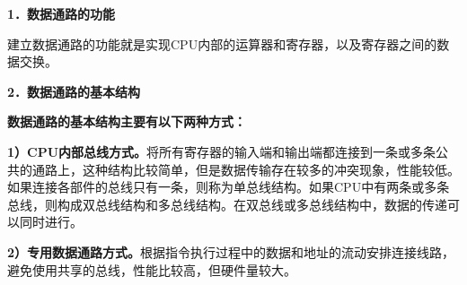 {\textbf{1．数据通路的功能}}

建立数据通路的功能就是实现CPU内部的运算器和寄存器，以及寄存器之间的数据交换。

{\textbf{2．数据通路的基本结构}}

\textbf{数据通路的基本结构主要有以下两种方式：}

\textbf{1）CPU内部总线方式。}将所有寄存器的输入端和输出端都连接到一条或多条公共的通路上，这种结构比较简单，但是数据传输存在较多的冲突现象，性能较低。如果连接各部件的总线只有一条，则称为单总线结构。如果CPU中有两条或多条总线，则构成双总线结构和多总线结构。在双总线或多总线结构中，数据的传递可以同时进行。

\textbf{2）专用数据通路方式。}根据指令执行过程中的数据和地址的流动安排连接线路，避免使用共享的总线，性能比较高，但硬件量较大。
